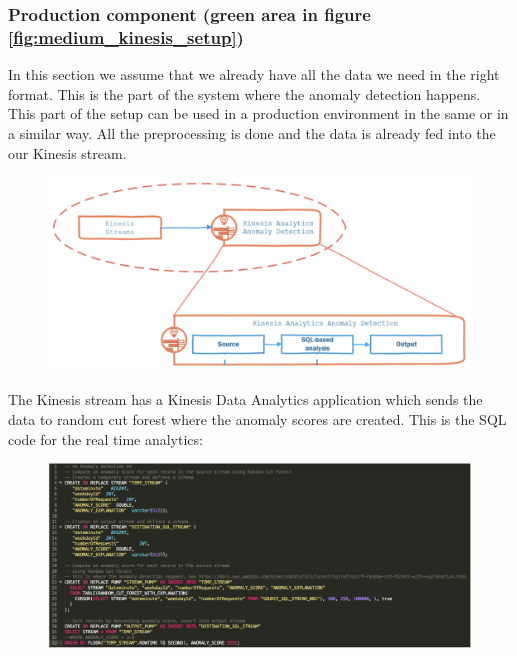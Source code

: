 \subsubsection{Production component (green area in figure \ref{fig:medium_kinesis_setup})}
In this section we assume that we already have all the data we need in the right format. This is the part of the system where the anomaly detection happens. This part of the setup can be used in a production environment in the same or in a similar way. All the preprocessing is done and the data is already fed into the our Kinesis stream.
\begin{figure}
    \centering
    \includegraphics[width=1\textwidth]{images/kinesis-rcf.png}
    \label{fig:medium_kinesis_data_analytics_rcf}
\end{figure}
\FloatBarrier
The Kinesis stream has a Kinesis Data Analytics application which sends the data to random cut forest where the anomaly scores are created. This is the SQL code for the real time analytics:
\begin{figure}
    \centering
    \includegraphics[width=1\textwidth]{images/sql-analytics.png}
    \label{fig:medium_sql_analytics}
\end{figure}
